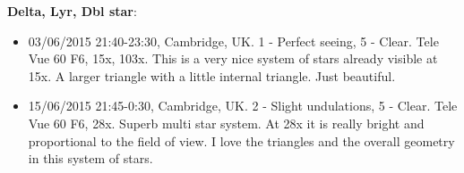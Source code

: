 {\bf Delta, Lyr, Dbl star}:
\begin{itemize}
\item 03/06/2015 21:40-23:30, Cambridge, UK. 1 - Perfect seeing, 5 - Clear. Tele Vue 60 F6, 15x, 103x. This is a very nice system of stars already visible at 15x. A larger triangle with a little internal triangle. Just beautiful.
\item 15/06/2015 21:45-0:30, Cambridge, UK. 2 - Slight undulations, 5 - Clear. Tele Vue 60 F6, 28x. Superb multi star system. At 28x it is really bright and proportional to the field of view. I love the triangles and the overall geometry in this system of stars.
\end{itemize}
